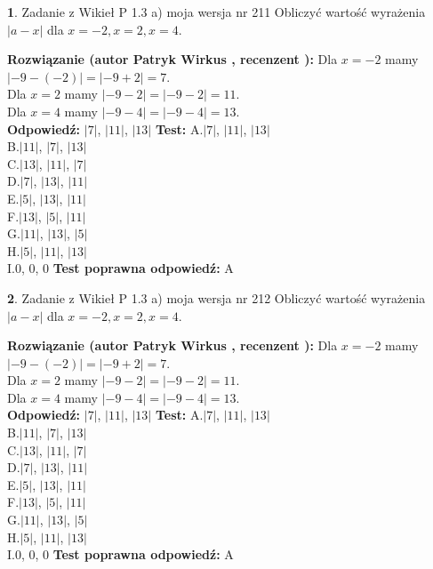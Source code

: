 \documentclass[12pt, a4paper]{article}
\theoremstyle{definition} %
\newtheorem{zad}{}
\newcommand{\zadStart}[1]{\begin{zad}#1\newline}
\newcommand{\zadStop}{\end{zad}}
\newcommand{\rozwStart}[2]{\noindent \textbf{Rozwiązanie (autor #1 , recenzent #2): }\newline}
\newcommand{\rozwStop}{\newline}
\newcommand{\odpStart}{\noindent \textbf{Odpowiedź:}\newline}
\newcommand{\odpStop}{\newline}
\newcommand{\testStart}{\noindent \textbf{Test:}\newline}
\newcommand{\testStop}{\newline}
\newcommand{\kluczStart}{\noindent \textbf{Test poprawna odpowiedź:}\newline}
\newcommand{\kluczStop}{\newline}
\begin{document}
\zadStart{Zadanie z Wikieł P 1.3 a) moja wersja nr 211}
Obliczyć wartość wyrażenia $|a - x|$ dla $x=-2,x=2,x=4$.
\zadStop
\rozwStart{Patryk Wirkus}{}
Dla $x = -2$ mamy $|-9 - (-2)| = |-9 + 2| = 7$.\\
Dla $x = 2$ mamy $|-9 - 2| = |-9 - 2| = 11$.\\
Dla $x = 4$ mamy $|-9 - 4| = |-9 - 4| = 13$.\\
\rozwStop
\odpStart
$|7|$, $|11|$, $|13|$
\odpStop
\testStart
A.$|7|$, $|11|$, $|13|$\\
B.$|11|$, $|7|$, $|13|$\\
C.$|13|$, $|11|$, $|7|$\\
D.$|7|$, $|13|$, $|11|$\\
E.$|5|$, $|13|$, $|11|$\\
F.$|13|$, $|5|$, $|11|$\\
G.$|11|$, $|13|$, $|5|$\\
H.$|5|$, $|11|$, $|13|$\\
I.$0$, $0$, $0$
\testStop
\kluczStart
A
\kluczStop



\zadStart{Zadanie z Wikieł P 1.3 a) moja wersja nr 212}
Obliczyć wartość wyrażenia $|a - x|$ dla $x=-2,x=2,x=4$.
\zadStop
\rozwStart{Patryk Wirkus}{}
Dla $x = -2$ mamy $|-9 - (-2)| = |-9 + 2| = 7$.\\
Dla $x = 2$ mamy $|-9 - 2| = |-9 - 2| = 11$.\\
Dla $x = 4$ mamy $|-9 - 4| = |-9 - 4| = 13$.\\
\rozwStop
\odpStart
$|7|$, $|11|$, $|13|$
\odpStop
\testStart
A.$|7|$, $|11|$, $|13|$\\
B.$|11|$, $|7|$, $|13|$\\
C.$|13|$, $|11|$, $|7|$\\
D.$|7|$, $|13|$, $|11|$\\
E.$|5|$, $|13|$, $|11|$\\
F.$|13|$, $|5|$, $|11|$\\
G.$|11|$, $|13|$, $|5|$\\
H.$|5|$, $|11|$, $|13|$\\
I.$0$, $0$, $0$
\testStop
\kluczStart
A
\kluczStop
\end{document}
